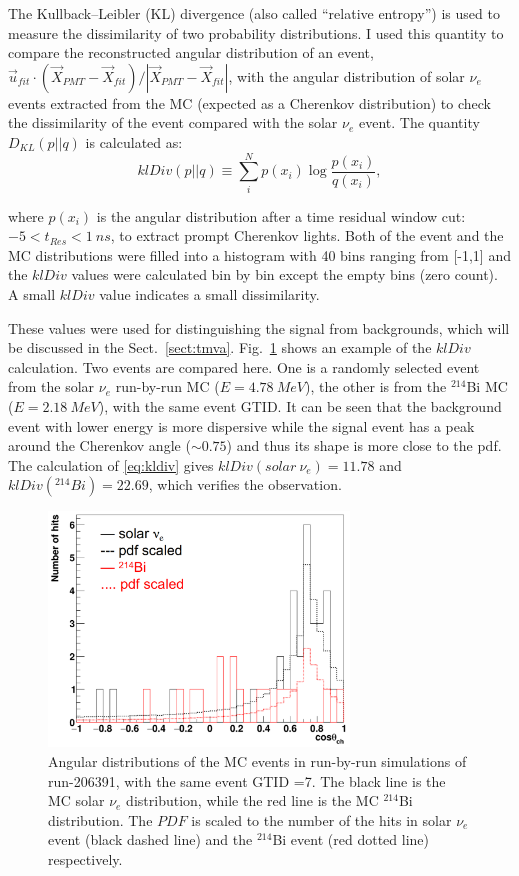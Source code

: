 The Kullback–Leibler (KL) divergence (also called ``relative entropy'') is used to measure the dissimilarity of two probability distributions\cite{murphy2012machine}. I used this quantity to compare the reconstructed angular distribution of an event, $\vec{u}_{fit}\cdot(\vec{X}_{PMT}-\vec{X}_{fit})/|\vec{X}_{PMT}-\vec{X}_{fit}|$, with the angular distribution of solar $\nu_e$ events extracted from the MC (expected as a Cherenkov distribution) to check the dissimilarity of the event compared with the solar $\nu_e$ event. The quantity $D_{KL}(p||q)$ is calculated as: 
\begin{equation}\label{eq:kldiv}
klDiv(p||q) \equiv \sum_{i}^N p(x_i)\log{\frac{p(x_i)}{q(x_i)}},
\end{equation}

where $p(x_i)$ is the angular distribution after a time residual window cut: $-5<t_{Res}<1~ns$, to extract prompt Cherenkov lights. Both of the event and the MC distributions were filled into a histogram with 40 bins ranging from [-1,1] and the $klDiv$ values were calculated bin by bin except the empty bins (zero count). A small $klDiv$ value indicates a small dissimilarity.

These values were used for distinguishing the signal from backgrounds, which will be discussed in the Sect.~\ref{sect:tmva}. Fig.~\ref{kLdiv_example} shows an example of the $klDiv$ calculation. Two events are compared here. One is a randomly selected event from the solar $\nu_e$ run-by-run MC ($E=4.78~MeV$), the other is from the $^{214}$Bi MC ($E=2.18~MeV$), with the same event GTID. It can be seen that the background event with lower energy is more dispersive while the signal event has a peak around the Cherenkov angle ($\sim 0.75$) and thus its shape is more close to the pdf. The calculation of \ref{eq:kldiv} gives $klDiv(solar~\nu_e)=11.78$ and $klDiv(^{214}Bi)=22.69$, which verifies the observation.

\begin{figure}[!htb]
	\centering
	\includegraphics[width=8cm]{klDiv_example.png}
	\caption[Angular distributions of the MC events in run-by-run simulations.]{Angular distributions of the MC events in run-by-run simulations of run-206391, with the same event GTID =7. The black line is the MC solar $\nu_e$ distribution, while the red line is the MC $^{214}$Bi distribution. The $PDF$ is scaled to the number of the hits in solar $\nu_e$ event (black dashed line) and the $^{214}$Bi event (red dotted line) respectively.}
	\label{kLdiv_example}
\end{figure}

